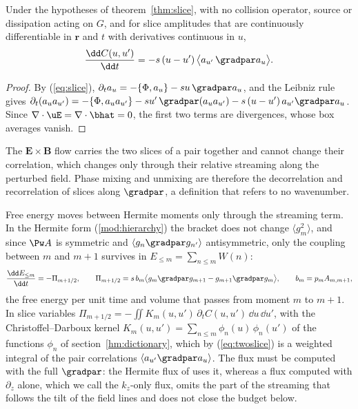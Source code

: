 \begin{proposition}\label{prop:twoslice}
Under the hypotheses of theorem~\ref{thm:slice}, with no collision operator, source or dissipation acting on $G$, and for slice amplitudes that are continuously differentiable in $\boldsymbol r$ and $t$ with derivatives continuous in $u$,
\begin{equation}\label{eq:twoslice}
  \frac{\dd C(u,u')}{\dd t}=-s\,(u-u')\,\big\langle a_{u'}\,\gradpar a_u\big\rangle .
\end{equation}
\end{proposition}

\begin{proof}
By (\ref{eq:slice}), $\partial_ta_u=-\{\Phi,a_u\}-su\,\gradpar a_u$, and the Leibniz rule gives $\partial_t(a_ua_{u'})=-\{\Phi,a_ua_{u'}\}-su'\,\gradpar(a_ua_{u'})-s\,(u-u')\,a_{u'}\gradpar a_u$. Since $\nabla\cdot\uE=\nabla\cdot\bhat=0$, the first two terms are divergences, whose box averages vanish.
\end{proof}

The $\boldsymbol E\times\boldsymbol B$ flow carries the two slices of a pair together and cannot change their correlation, which changes only through their relative streaming along the perturbed field. Phase mixing and unmixing are therefore the decorrelation and recorrelation of slices along $\gradpar$, a definition that refers to no wavenumber.

Free energy moves between Hermite moments only through the streaming term. In the Hermite form (\ref{mod:hierarchy}) the bracket does not change $\langle g_m^2\rangle$, and since $\Pw A$ is symmetric and $\langle g_n\gradpar g_{n'}\rangle$ antisymmetric, only the coupling between $m$ and $m+1$ survives in $E_{\le m}=\sum_{n\le m}W(n)$:
\begin{equation}\label{eq:fluxCD}
  \frac{\dd E_{\le m}}{\dd t}=-\Pi_{m+1/2},\qquad
  \Pi_{m+1/2}=s\,b_m\big\langle g_m\gradpar g_{m+1}-g_{m+1}\gradpar g_m\big\rangle,\qquad b_m=p_mA_{m,m+1},
\end{equation}
the free energy per unit time and volume that passes from moment $m$ to $m+1$. In slice variables $\Pi_{m+1/2}=-\iint K_m(u,u')\,\partial_tC(u,u')\,\dd u\,\dd u'$, with the Christoffel--Darboux kernel $K_m(u,u')=\sum_{n\le m}\phi_n(u)\,\phi_n(u')$ of the functions $\phi_n$ of section~\ref{hm:dictionary}, which by (\ref{eq:twoslice}) is a weighted integral of the pair correlations $\langle a_{u'}\gradpar a_u\rangle$. The flux must be computed with the full $\gradpar$: the Hermite flux of \citet{Meyrand2019} uses it, whereas a flux computed with $\partial_z$ alone, which we call the $k_z$-only flux, omits the part of the streaming that follows the tilt of the field lines and does not close the budget below.


